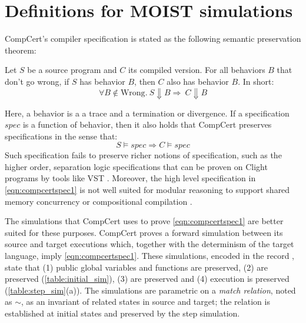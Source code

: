 \section{Definitions for MOIST simulations}\label{sec:compcert-sim}

CompCert's compiler specification is stated as the following semantic preservation theorem:
\begin{theorem}
Let $S$ be a source program and $C$ its compiled version. For all behaviors $B$ that don't go wrong, if $S$ has behavior $B$, then  
$C$ also has behavior $B$. In short:
\begin{equation}\forall B \not \in \text{Wrong}. \ S \Downarrow B \Rightarrow \ C \Downarrow B\label{eqn:compcertspec1}\end{equation}
\end{theorem}
Here, a behavior is a a trace and a termination or divergence. If a specification $spec$ is a function of behavior, then it also holds that CompCert preserves specifications in the sense that:
\begin{equation} S \models spec \Rightarrow C \models spec \end{equation}
Such specification fails to preserve richer notions of specification, such as the higher order, separation logic specifications that can be proven on Clight programs by tools like VST \cite{DBLP:journals/jar/CaoBGDA18}. 
Moreover, the high level specification in \cref{eqn:compcertspec1} is not well suited for modular reasoning to support shared memory concurrency or compositional compilation \cite{compcomp}. 

The simulations that CompCert uses to prove \cref{eqn:compcertspec1} are better suited for these purposes.
CompCert proves a forward simulation between its source and target executions which, together with the determinism of the target language, imply \cref{eqn:compcertspec1}. These simulations, encoded in the record , state that (1) public global variables and functions are preserved, (2)  are preserved (\cref{table:initial_sim}), (3)  are preserved and (4) execution is preserved (\cref{table:step_sim}(a)). The simulations are parametric on a \emph{match relation}, noted as $\overset{ }{\sim}$, as an invariant of related states in source and target; the relation is established at initial states and preserved by the step simulation. 

